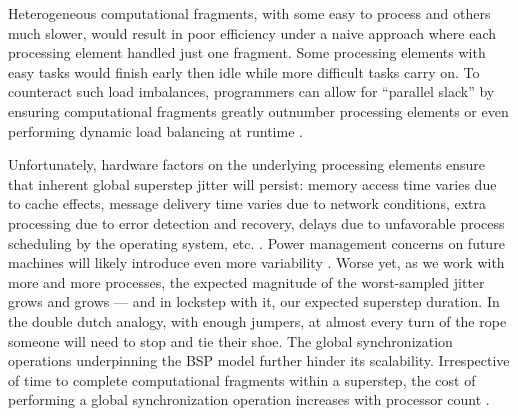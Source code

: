 Heterogeneous computational fragments, with some easy to process and others much slower, would result in poor efficiency under a naive approach where each processing element handled just one fragment.
Some processing elements with easy tasks would finish early then idle while more difficult tasks carry on.
To counteract such load imbalances, programmers can allow for ``parallel slack'' by ensuring computational fragments greatly outnumber processing elements or even performing dynamic load balancing at runtime \citep{valiant1990bridging}.

Unfortunately, hardware factors on the underlying processing elements ensure that inherent global superstep jitter will persist: memory access time varies due to cache effects, message delivery time varies due to network conditions, extra processing due to error detection and recovery, delays due to unfavorable process scheduling by the operating system, etc. \citep{dongarra2014applied}.
Power management concerns on future machines will likely introduce even more variability \citep{gropp2013programming}.
Worse yet, as we work with more and more processes, the expected magnitude of the worst-sampled jitter grows and grows --- and in lockstep with it, our expected superstep duration.
In the double dutch analogy, with enough jumpers, at almost every turn of the rope someone will need to stop and tie their shoe.
The global synchronization operations underpinning the BSP model further hinder its scalability.
Irrespective of time to complete computational fragments within a superstep, the cost of performing a global synchronization operation increases with processor count \citep{dongarra2014applied}.

